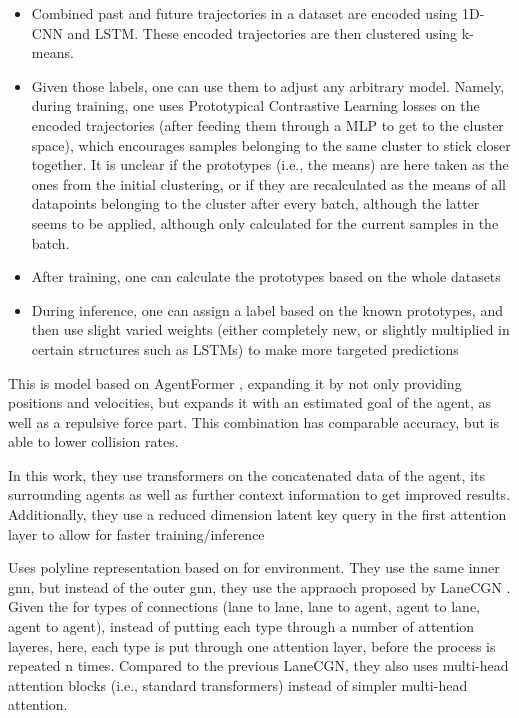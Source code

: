 \cite{wang2023fend} 
\begin{itemize}
    \item Combined past and future trajectories in a dataset are encoded using 1D-CNN and LSTM. These encoded trajectories are then clustered using k-means.
    \item Given those labels, one can use them to adjust any arbitrary model. Namely, during training, one uses Prototypical Contrastive Learning losses on the encoded trajectories (after feeding them through a MLP to get to the cluster space), which encourages samples belonging to the same cluster to stick closer together. It is unclear if the prototypes (i.e., the means) are here taken as the ones from the initial clustering, or if they are recalculated as the means of all datapoints belonging to the cluster after every batch, although the latter seems to be applied, although only calculated for the current samples in the batch.
    \item After training, one can calculate the prototypes based on the whole datasets
    \item During inference, one can assign a label based on the known prototypes, and then use slight varied weights (either completely new, or slightly multiplied in certain structures such as LSTMs) to make more targeted predictions
\end{itemize}


\cite{zhang2023forceformer} This is model based on AgentFormer \cite{yuan2021agentformer}, expanding it by not only providing positions and velocities, but expands it with an estimated goal of the agent, as well as a repulsive force part. This combination has comparable accuracy, but is able to lower collision rates.


\cite{nayakanti2023wayformer} In this work, they use transformers on the concatenated data of the agent, its surrounding agents as well as further context information to get improved results. Additionally, they use a reduced dimension latent key query in the first attention layer to allow for faster training/inference


\cite{aydemir2023adapt} Uses polyline representation based on \cite{gao2020vectornet} for environment. They use the same inner gnn, but instead of the outer gnn, they use the appraoch proposed by LaneCGN \cite{liang2020learning}. Given the for types of connections (lane to lane, lane to agent, agent to lane, agent to agent), instead of putting each type through a number of attention layeres, here, each type is put through one attention layer, before the process is repeated n times. Compared to the previous LaneCGN, they also uses multi-head attention blocks (i.e., standard transformers) instead of simpler multi-head attention.

